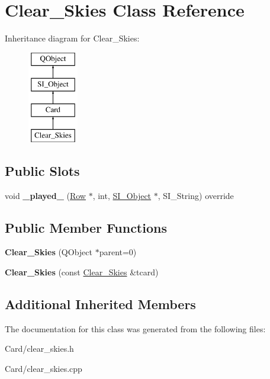 \hypertarget{class_clear___skies}{}\section{Clear\+\_\+\+Skies Class Reference}
\label{class_clear___skies}
Inheritance diagram for Clear\+\_\+\+Skies\+:\begin{figure}[H]
\begin{center}
\leavevmode
\includegraphics[height=4.000000cm]{class_clear___skies}
\end{center}
\end{figure}
\subsection*{Public Slots}
\begin{DoxyCompactItemize}
\item 
\mbox{\label{class_clear___skies_a58f273dc4f45050e1ff52604cad1b8ed}} 
void {\bfseries \+\_\+played\+\_\+} (\hyperlink{class_card_set}{Row} $\ast$, int, \hyperlink{class_s_i___object}{S\+I\+\_\+\+Object} $\ast$, S\+I\+\_\+\+String) override
\end{DoxyCompactItemize}
\subsection*{Public Member Functions}
\begin{DoxyCompactItemize}
\item 
\mbox{\label{class_clear___skies_ae729b11200b90be062b520de03b231a0}} 
{\bfseries Clear\+\_\+\+Skies} (Q\+Object $\ast$parent=0)
\item 
\mbox{\label{class_clear___skies_aba7c01fdd9ba1a48e62cf5db7be5d6bc}} 
{\bfseries Clear\+\_\+\+Skies} (const \hyperlink{class_clear___skies}{Clear\+\_\+\+Skies} \&tcard)
\end{DoxyCompactItemize}
\subsection*{Additional Inherited Members}


The documentation for this class was generated from the following files\+:\begin{DoxyCompactItemize}
\item 
Card/clear\+\_\+skies.\+h\item 
Card/clear\+\_\+skies.\+cpp\end{DoxyCompactItemize}
